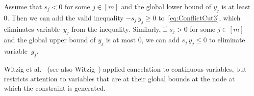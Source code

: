 \documentclass[10pt, a4paper]{article}
\begin{document}
Assume that $s_j < 0$ for some $j \in [m]$ and the global lower bound of
$y_j$ is at least 0. Then we can add the valid inequality $-s_j\, y_j \geq 0$
to~\eqref{eq:ConflictCut3}, which eliminates variable~$y_j$ from the
inequality. Similarly, if $s_j > 0$ for some $j \in [m]$ and the global
upper bound of $y_j$ is at most 0, we can add $s_j\, y_j \leq 0$ to
eliminate variable~$y_j$.

Witzig et al.~\cite{WitBH17} (see also Witzig~\cite{Wit22}) applied
cancelation to continuous variables, but restricts attention to variables
that are at their global bounds at the node at which the constraint is
generated.


\begin{small}
   
   
\end{small}
\end{document}
